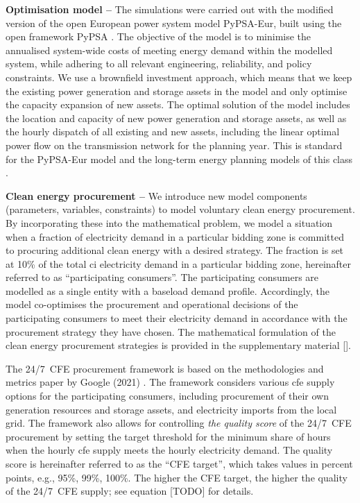 \textbf{Optimisation model --} The simulations were carried out with the modified version of the open European power system model PyPSA-Eur, built using the open framework PyPSA \cite{brownPyPSAPythonPower2018}.
The objective of the model is to minimise the annualised system-wide costs of meeting energy demand within the modelled system, while adhering to all relevant engineering, reliability, and policy constraints.
We use a brownfield investment approach, which means that we keep the existing power generation and storage assets in the model and only optimise the capacity expansion of new assets.
The optimal solution of the model includes the location and capacity of new power generation and storage assets, as well as the hourly dispatch of all existing and new assets, including the linear optimal power flow on the transmission network for the planning year. 
This is standard for the PyPSA-Eur model \cite{horschPyPSAEurOpenOptimisation2018} and the long-term energy planning models of this class \cite{jenkinsGenX2022, howellsOSeMOSYSOpenSource2011}.

\textbf{Clean energy procurement --} We introduce new model components (parameters, variables, constraints) to model voluntary clean energy procurement.
By incorporating these into the mathematical problem, we model a situation when a fraction of electricity demand in a particular bidding zone is committed to procuring additional clean energy with a desired strategy.
The fraction is set at 10\% of the total \gls{ci} electricity demand in a particular bidding zone, hereinafter referred to as \enquote{participating consumers}.
The participating consumers are modelled as a single entity with a baseload demand profile.
Accordingly, the model co-optimises the procurement and operational decisions of the participating consumers to meet their electricity demand in accordance with the procurement strategy they have chosen.
The mathematical formulation of the clean energy procurement strategies is provided in the supplementary material [].

The 24/7~CFE procurement framework is based on the methodologies and metrics paper by Google (2021) \cite{google-methodologies}.
The framework considers various \gls{cfe} supply options for the participating consumers, including procurement of their own generation resources and storage assets, and electricity imports from the local grid.
The framework also allows for controlling \textit{the quality score} of the 24/7~CFE procurement by setting the target threshold for the minimum share of hours when the hourly \gls{cfe} supply meets the hourly electricity demand.
The quality score is hereinafter referred to as the \enquote{CFE target}, which takes values in percent points, e.g., 95\%, 99\%, 100\%.
The higher the CFE target, the higher the quality of the 24/7~CFE supply; see equation [TODO] for details.

